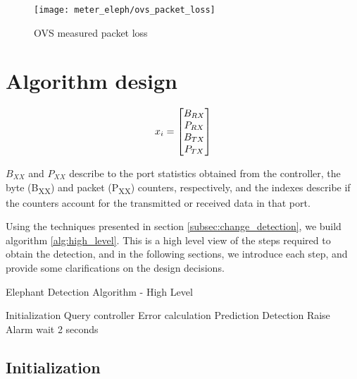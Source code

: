 \begin{figure} 
    \centering
    \texttt{[image: meter\_eleph/ovs\_packet\_loss]}
    \caption {OVS measured packet loss}
    \label{fig:ovs_packet_loss}
\end{figure} 

\section {Algorithm design}

\begin {equation*}
\centering
x_i = 
\begin{bmatrix}
B_{RX}\\
P_{RX}\\
B_{TX}\\
P_{TX}\\
\end{bmatrix}
\end {equation*}

\par $B_{XX}$ and $P_{XX}$ describe to the port statistics obtained from the controller, the byte (B\textsubscript{XX}) and packet (P\textsubscript{XX}) counters, respectively, and the indexes describe if the counters
account for the transmitted or received data in that port.

\par Using the techniques presented in section \ref{subsec:change_detection}, we build algorithm \ref{alg:high_level}. This is a high level view of the steps required to obtain the detection, and in the following sections,
we introduce each step, and provide some clarifications on the design decisions.

\begin{algorithm}[H]
    \caption{Elephant Detection Algorithm - High Level} \label{alg:high_level}
    \begin{algorithmic}[1]
            \State Initialization
            \State Query controller
            \Loop
                \State Error calculation
                \State Prediction
                \State Detection
                    \State Raise Alarm
                \EndIf
                \State wait 2 seconds
            \EndLoop
        \EndProcedure 
       \end{algorithmic}
\end{algorithm}

\subsection{Initialization}

